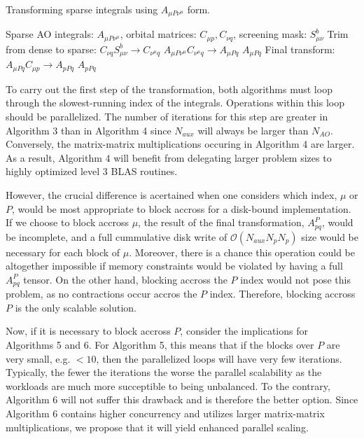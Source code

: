 \begin{algorithm}[H]
\caption{Transforming sparse integrals using $A_{\mu P \nu^\mu}$ form.}
\begin{algorithmic}
\REQUIRE Sparse AO integrals: $A_{\mu P \nu^\mu}$, orbital matrices: $C_{\mu p}, C_{\nu q}$, screening mask: $S_{\mu \nu}^b$
    \STATE Trim from dense to sparse: $C_{\nu q}S_{\mu \nu}^b \rightarrow C_{\nu^{\mu} q}$
    \STATE $A_{\mu P \nu^{\mu}} C_{\nu^{\mu} q} \rightarrow A_{\mu Pq}$
\ENDFOR
\RETURN $A_{\mu P q}$
\STATE Final transform: $A_{\mu P q}C_{\mu p} \rightarrow A_{p P q}$
\RETURN $A_{p P q}$
\end{algorithmic}
\end{algorithm}


To carry out the first step of the transformation, both algorithms must loop through the slowest-running index of the integrals.
Operations within this loop should be parallelized.
The number of iterations for this step are greater in Algorithm 3 than in Algorithm 4 since $N_{aux}$ will always be 
larger than $N_{AO}$.
Conversely, the matrix-matrix multiplications occuring in Algorithm 4 are larger. As a result, Algorithm 4 will benefit from delegating
larger problem sizes to highly optimized level 3 BLAS routines. 

However, the crucial difference is acertained when one considers which index, $\mu$ or $P$, would be most appropriate to block accross
for a disk-bound implementation. If we choose to block accross $\mu$, the result of the final transformation, $A_{pq}^P$, would be incomplete,
and a full cummulative disk write of $\mathcal{O}(N_{aux}N_pN_p)$ size would be necessary for each block of $\mu$. Moreover, there is a chance
this operation could be altogether impossible if memory constraints would be violated by having a full $A_{pq}^P$ tensor. On the other hand, 
blocking accross the $P$ index would not pose this problem, as no contractions occur accros the $P$ index. Therefore, blocking accross 
$P$ is the only scalable solution.

Now, if it is necessary to block accross $P$, consider the implications for Algorithms 5 and 6. For Algorithm 5, this means that if the blocks
over $P$ are very small, e.g. $<10$, then the parallelized loops will have very few iterations. Typically, the fewer the iterations the worse
the parallel scalability as the workloads are much more succeptible to being unbalanced. To the contrary, Algorithm 6 will not suffer this 
drawback and is therefore the better option. Since Algorithm 6 contains higher concurrency and utilizes larger matrix-matrix multiplications, 
we propose that it will yield enhanced parallel scaling.  


